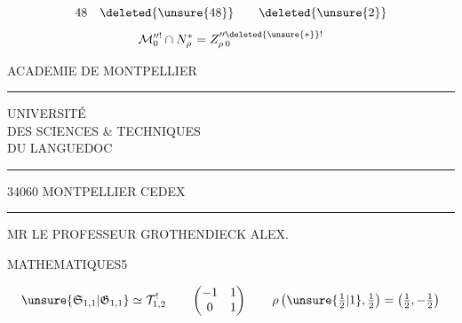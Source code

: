 
\[
48\quad\deleted{\unsure{48}}\qquad\deleted{\unsure{2}}
\]
\[
\mathcal M_0^{\prime\prime!}\cap N_\rho^*=Z_{\rho\,0}^{\prime\prime\deleted{\unsure{*}}!}
\]


\begin{center}
ACADEMIE DE MONTPELLIER\\
\rule{2cm}{0.4pt}

UNIVERSITÉ\\
DES SCIENCES \& TECHNIQUES\\
DU LANGUEDOC\\
\rule{2cm}{0.4pt}

34060 MONTPELLIER CEDEX\\
\rule{2cm}{0.4pt}
\end{center}

MR LE PROFESSEUR GROTHENDIECK ALEX.

MATHEMATIQUES\hfill 5



\[
\unsure{\mathfrak S_{1,1}|\mathfrak G_{1,1}}\simeq\mathcal T_{1,2}^{!}
\qquad
\begin{pmatrix}-1&1\\0&1\end{pmatrix}
\qquad
\rho\left(\unsure{\tfrac12|1},\tfrac12\right)=\left(\tfrac12,-\tfrac12\right)
\]

